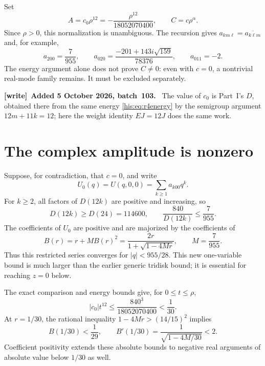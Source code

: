 \documentclass[11pt]{article}
\theoremstyle{remark}\newtheorem{remark}[theorem]{Remark}
\numberwithin{equation}{section}
\newenvironment{writenote}[1][]{\par\smallskip\begingroup\small
 \noindent\textbf{[write]}\if\relax\detokenize{#1}\relax\else~\textbf{#1.}\fi\ }%
 {\par\endgroup\smallskip}
\begin{document}
Set
\begin{equation}\label{his:o7:AC}
A=c_0\rho^{12}=-\frac{\rho^{12}}{18052070400},\qquad
C=c\rho^\alpha.
\end{equation}
Since $\rho>0$, this normalization is unambiguous.
The recursion gives $a_{km\ell}=\overline{a_{k\ell m}}$ and,
for example,
\begin{equation}\label{his:o7:second-coeffs}
a_{200}=\frac7{955},\qquad
 a_{020}=\frac{-201+143i\sqrt{159}}{78376},\qquad
 a_{011}=-2.
\end{equation}
The energy argument alone does not prove $C\ne0$: even with
$c=0$, a nontrivial real-mode family remains. It must be excluded
separately.
\begin{writenote}[Added 5 October 2026, batch~103]
The value of $c_0$ is Part~I's $D$, obtained there from the same energy \eqref{his:eq:r4energy} by the semigroup argument $12m+11k=12$; here the weight identity $EJ=12J$ does the same work.
\end{writenote}


\section{The complex amplitude is nonzero}\label{his:o7:nonzero}
Suppose, for contradiction, that $c=0$, and write
\[
U_0(q)=U(q,0,0)=\sum_{k\ge1}a_{k00}q^k.
\]
For $k\ge2$, all factors of $D(12k)$ are positive and increasing,
so
\[
D(12k)\ge D(24)=114600,\qquad
\frac{840}{D(12k)}\le\frac7{955}.
\]
The coefficients of $U_0$ are positive and are majorized by the
coefficients of
\begin{equation}\label{his:o7:scalar-majorant}
B(r)=r+MB(r)^2
=\frac{2r}{1+\sqrt{1-4Mr}},\qquad M=\frac7{955}.
\end{equation}
Thus this restricted series converges for $|q|<955/28$.
This new one-variable bound is much larger than the earlier generic
tridisk bound; it is essential for reaching $z=0$ below.

The exact comparison and energy bounds give, for $0\le t\le\rho$,
\begin{equation}\label{his:o7:small-q}
|c_0|t^{12}\le\frac{840^3}{18052070400}<\frac1{30}.
\end{equation}
At $r=1/30$, the rational inequality
$1-4Mr>(14/15)^2$ implies
\begin{equation}\label{his:o7:scalar-bounds}
B(1/30)<\frac1{29},\qquad
B'(1/30)=\frac1{\sqrt{1-4M/30}}<2.
\end{equation}
Coefficient positivity extends these absolute bounds to negative
real arguments of absolute value below $1/30$ as well.
\end{document}
